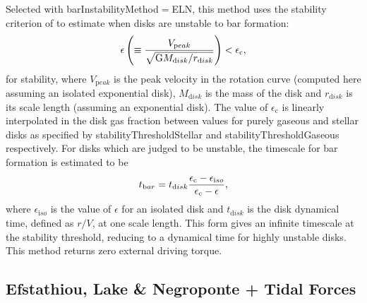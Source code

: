 Selected with {\normalfont \ttfamily barInstabilityMethod}$=${\normalfont \ttfamily ELN}, this method uses the stability criterion of \cite{efstathiou_stability_1982} to estimate when disks are unstable to bar formation:
\begin{equation}
 \epsilon \left( \equiv {V_{\mathrm peak} \over \sqrt{\G M_{\mathrm disk}/r_{\mathrm disk}}} \right) < \epsilon_{\mathrm c},
\end{equation}
for stability, where $V_{\mathrm peak}$ is the peak velocity in the rotation curve (computed here assuming an isolated exponential disk), $M_{\mathrm disk}$ is the mass of the disk and $r_{\mathrm disk}$ is its scale length (assuming an exponential disk). The value of $\epsilon_{\mathrm c}$ is linearly interpolated in the disk gas fraction between values for purely gaseous and stellar disks as specified by {\normalfont \ttfamily stabilityThresholdStellar} and {\normalfont \ttfamily stabilityThresholdGaseous} respectively. For disks which are judged to be unstable, the timescale for bar formation is estimated to be
\begin{equation}
 t_{\mathrm bar} = t_{\mathrm disk} {\epsilon_{\mathrm c} - \epsilon_{\mathrm iso} \over \epsilon_{\mathrm c} - \epsilon},
\end{equation}
where $\epsilon_{\mathrm iso}$ is the value of $\epsilon$ for an isolated disk and $t_{\mathrm disk}$ is the disk dynamical time, defined as $r/V$, at one scale length. This form gives an infinite timescale at the stability threshold, reducing to a dynamical time for highly unstable disks. This method returns zero external driving torque.

\subsection{Efstathiou, Lake \& Negroponte + Tidal Forces}

